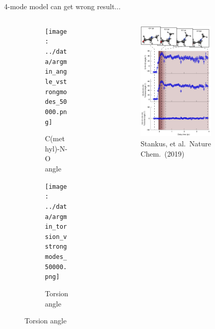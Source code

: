 \documentclass{beamer}
\begin{document}
\begin{frame}{4-mode model can get wrong result...}
\begin{columns}
\begin{column}{0.5\textwidth}
\begin{figure}
\begin{subfigure}[b]{\textwidth}
		\centering
		\texttt{[image: ../data/argmin\_angle\_vstrongmodes\_50000.png]}
		\caption{C(methyl)-N-O angle}
	\end{subfigure}
	\begin{subfigure}[b]{\textwidth}
		\centering
		\texttt{[image: ../data/argmin\_torsion\_vstrongmodes\_50000.png]}
		\caption{Torsion angle}
	\end{subfigure}
\end{figure}
\end{column}

\begin{column}{0.5\textwidth}
\begin{figure}[H]
	\centering
	\includegraphics[width=0.7\textwidth]{stankus_angle_plots.png}
	\caption{{\tiny Stankus, et al.\ Nature Chem.\ (2019)}}
	\label{fig:nmm-geom}
\end{figure}
\end{column}
\end{columns}

\end{frame}
\end{document}
